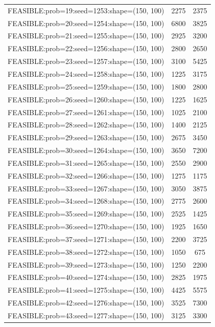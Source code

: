 \begin{longtable}{lcc}
FEASIBLE:prob=19:seed=1253:shape=(150, 100)  &     2275 &  2375 \\
FEASIBLE:prob=20:seed=1254:shape=(150, 100)  &     6800 &  3825 \\
FEASIBLE:prob=21:seed=1255:shape=(150, 100)  &     2925 &  3200 \\
FEASIBLE:prob=22:seed=1256:shape=(150, 100)  &     2800 &  2650 \\
FEASIBLE:prob=23:seed=1257:shape=(150, 100)  &     3100 &  5425 \\
FEASIBLE:prob=24:seed=1258:shape=(150, 100)  &     1225 &  3175 \\
FEASIBLE:prob=25:seed=1259:shape=(150, 100)  &     1800 &  2800 \\
FEASIBLE:prob=26:seed=1260:shape=(150, 100)  &     1225 &  1625 \\
FEASIBLE:prob=27:seed=1261:shape=(150, 100)  &     1025 &  2100 \\
FEASIBLE:prob=28:seed=1262:shape=(150, 100)  &     1400 &  2125 \\
FEASIBLE:prob=29:seed=1263:shape=(150, 100)  &     2675 &  3450 \\
FEASIBLE:prob=30:seed=1264:shape=(150, 100)  &     3650 &  7200 \\
FEASIBLE:prob=31:seed=1265:shape=(150, 100)  &     2550 &  2900 \\
FEASIBLE:prob=32:seed=1266:shape=(150, 100)  &     1275 &  1175 \\
FEASIBLE:prob=33:seed=1267:shape=(150, 100)  &     3050 &  3875 \\
FEASIBLE:prob=34:seed=1268:shape=(150, 100)  &     2775 &  2600 \\
FEASIBLE:prob=35:seed=1269:shape=(150, 100)  &     2525 &  1425 \\
FEASIBLE:prob=36:seed=1270:shape=(150, 100)  &     1925 &  1650 \\
FEASIBLE:prob=37:seed=1271:shape=(150, 100)  &     2200 &  3725 \\
FEASIBLE:prob=38:seed=1272:shape=(150, 100)  &     1050 &   675 \\
FEASIBLE:prob=39:seed=1273:shape=(150, 100)  &     1250 &  2200 \\
FEASIBLE:prob=40:seed=1274:shape=(150, 100)  &     2825 &  1975 \\
FEASIBLE:prob=41:seed=1275:shape=(150, 100)  &     4425 &  5575 \\
FEASIBLE:prob=42:seed=1276:shape=(150, 100)  &     3525 &  7300 \\
FEASIBLE:prob=43:seed=1277:shape=(150, 100)  &     3125 &  3300 \\

\end{longtable}

